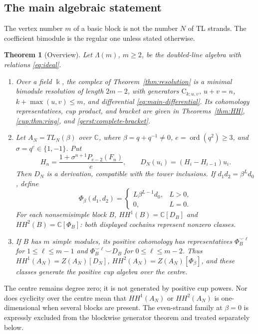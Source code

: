 \documentclass[a4paper,11pt,oneside,reqno]{amsart}
\newtheorem{theorem}{Theorem}[section]
\theoremstyle{definition}
\numberwithin{equation}{section}
\begin{document}
\subsection{The main algebraic statement}
The vertex number $m$ of a basic block is not the number $N$ of TL
strands. The coefficient bimodule is the regular one unless stated
otherwise.
\begin{theorem}[Overview]\label{tl:overview}
Let $\Lambda(m)$, $m\ge2$, be the doubled-line algebra with relations
\eqref{eq:ideal}.
\begin{enumerate}
\item Over a field $\Bbbk$, the complex of Theorem~\ref{thm:resolution}
is a minimal bimodule resolution of length $2m-2$, with generators
$\mathrm C_{k;u,v}$, $u+v=n$, $k+\max(u,v)\le m$, and differential
\eqref{eq:main-differential}. Its cohomology representatives, cup product,
and bracket are given in Theorems~\ref{thm:HH}, \ref{cup:thm:ring},
and \ref{gerst:complete-bracket}.
\item Let $A_N=TL_N(\beta)$ over $\mathbb C$, where
$\beta=q+q^{-1}\ne0$, $e=\operatorname{ord}(q^2)\ge3$, and
$\sigma=q^e\in\{1,-1\}$. Put
\[
 H_n=\frac{1+\sigma^{n+1}P_{e-2}(F_n)}e,
 \qquad D_N(u_i)=(H_i-H_{i-1})u_i.
\]
Then $D_N$ is a derivation, compatible with the tower inclusions.
If $d_1d_2=\beta^Ld_0$, define
\[
 \Phi_\beta(d_1,d_2)=
 \begin{cases}L\beta^{L-1}d_0,&L>0,\\0,&L=0.\end{cases}
\]
For each nonsemisimple block $B$,
$HH^1(B)=\mathbb C[D_B]$ and $HH^2(B)=\mathbb C[\Phi_B]$:
both displayed cochains represent nonzero classes.
\item If $B$ has $m$ simple modules, its positive cohomology has
representatives $\Phi_B^{\smile\ell}$ for $1\le\ell\le m-1$ and
$\Phi_B^{\smile\ell}\smile D_B$ for $0\le\ell\le m-2$.
Thus $HH^1(A_N)=Z(A_N)[D_N]$, $HH^2(A_N)=Z(A_N)[\Phi_\beta]$,
and these classes generate the positive cup algebra over the centre.
\end{enumerate}
\end{theorem}
The centre remains degree zero; it is not generated by positive cup
powers. Nor does cyclicity over the centre mean that $HH^1(A_N)$ or
$HH^2(A_N)$ is one-dimensional when several blocks are present.
The even-strand family at $\beta=0$ is expressly excluded from the
blockwise generator theorem and treated separately below.
\end{document}
